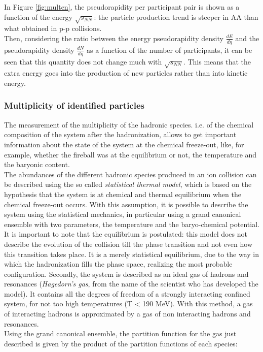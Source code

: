 %
In Figure \ref{fig:multen}, the pseudorapidity per participant pair is shown as a function of the energy $\sqrt{s_{NN}}$: the particle production trend is steeper in AA than what obtained in p-p collisions.\\
Then, considering the ratio between the energy pseudorapidity density $\frac{dE}{d\eta}$ and  the pseudorapidity density $\frac{dN}{d\eta}$ as a function of the number of participants, it can be seen that this quantity does not change much with $\sqrt{s_{NN}}$. This means that the extra energy goes into the production of new particles rather than into kinetic energy.\\
\subsubsection{Multiplicity of identified particles}
The measurement of the multiplicity of the hadronic species. i.e. of the chemical composition of the system after the hadronization, allows to get important information about the state of the system at the chemical freeze-out, like, for example, whether the fireball was at the equilibrium or not, the temperature and the baryonic content.\\
The abundances of the different hadronic species produced in an ion collision can be described using the so called \textit{statistical thermal model}, which is based on the hypothesis that the system is at chemical and thermal equilibrium when the chemical freeze-out occurs. With this assumption, it is possible to describe the system using the statistical mechanics, in particular using a grand canonical ensemble with two parameters, the temperature and the baryo-chemical potential. It is important to note that the equilibrium is postulated: this model does not describe the evolution of the collision till the phase transition and not even how this transition takes place. It is a merely statistical equilibrium, due to the way in which the hadronization fills the phase space, realizing the most probable configuration. Secondly, the system is described as an ideal gas of hadrons and resonances (\textit{Hagedorn's gas}, from the name of the scientist who has developed the model). It contains all the degrees of freedom of a strongly interacting confined system, for not too high temperatures (T < 190 MeV). With this method, a gas of interacting hadrons is approximated by a gas of non interacting hadrons and resonances.\\
Using the grand canonical ensemble, the partition function for the gas just described is given by the product of the partition functions of each species:
